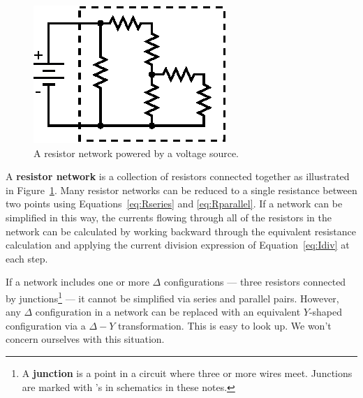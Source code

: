 \documentclass[11pt]{article}
\begin{document}
\begin{figure}[ht]
  \begin{center}
    \includegraphics{rnetwork.eps}
    \caption{A resistor network powered by a voltage source.}
    \label{fig:rnetwork}
  \end{center}
\end{figure}

A \textbf{resistor network} is a collection of resistors connected
together as illustrated in Figure~\ref{fig:rnetwork}. Many resistor
networks can be reduced to a single resistance between two points using
Equations~\ref{eq:Rseries} and \ref{eq:Rparallel}. If a network can
be simplified in this way, the currents flowing through all of the
resistors in the network can be calculated by working backward through
the equivalent resistance calculation and applying the current
division expression of Equation~\ref{eq:Idiv} at each step.

If a network includes one or more $\Delta$ configurations --- three
resistors connected by junctions\footnote{A \textbf{junction} is a
  point in a circuit where three or more wires meet. Junctions are
  marked with \textbullet's in schematics in these notes.} --- it
cannot be simplified via series and parallel pairs. However, any
$\Delta$ configuration in a network can be replaced with an equivalent
$Y$-shaped configuration via a $\Delta-Y$ transformation. This is easy
to look up. We won't concern ourselves with this situation.

\vspace{12 pt}
\noindent
{}
  
\end{document}
